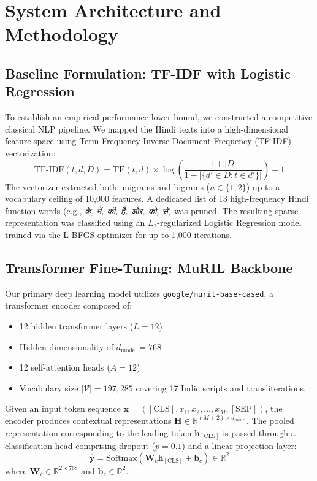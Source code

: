 \documentclass[11pt,a4paper]{article}
\begin{document}
\section{System Architecture and Methodology}
\label{sec:methodology}

\subsection{Baseline Formulation: TF-IDF with Logistic Regression}
To establish an empirical performance lower bound, we constructed a competitive classical NLP pipeline. We mapped the Hindi texts into a high-dimensional feature space using Term Frequency-Inverse Document Frequency (TF-IDF) vectorization:
\begin{equation}
\text{TF-IDF}(t, d, D) = \text{TF}(t, d) \times \log\left(\frac{1 + |D|}{1 + |\{d' \in D : t \in d'\}|}\right) + 1
\end{equation}
The vectorizer extracted both unigrams and bigrams ($n \in \{1, 2\}$) up to a vocabulary ceiling of 10,000 features. A dedicated list of 13 high-frequency Hindi function words (e.g., \textit{के, में, की, है, और, को, से}) was pruned. The resulting sparse representation was classified using an $L_2$-regularized Logistic Regression model trained via the L-BFGS optimizer for up to 1,000 iterations.

\subsection{Transformer Fine-Tuning: MuRIL Backbone}
Our primary deep learning model utilizes \texttt{google/muril-base-cased}, a transformer encoder composed of:
\begin{itemize}
    \item 12 hidden transformer layers ($L = 12$)
    \item Hidden dimensionality of $d_{\text{model}} = 768$
    \item 12 self-attention heads ($A = 12$)
    \item Vocabulary size $|\mathcal{V}| = 197,285$ covering 17 Indic scripts and transliterations.
\end{itemize}

Given an input token sequence $\mathbf{x} = ([\text{CLS}], x_1, x_2, \dots, x_M, [\text{SEP}])$, the encoder produces contextual representations $\mathbf{H} \in \mathbb{R}^{(M+2) \times d_{\text{model}}}$. The pooled representation corresponding to the leading token $\mathbf{h}_{[\text{CLS}]}$ is passed through a classification head comprising dropout ($p = 0.1$) and a linear projection layer:
\begin{equation}
\hat{\mathbf{y}} = \text{Softmax}(\mathbf{W}_c \mathbf{h}_{[\text{CLS}]} + \mathbf{b}_c) \in \mathbb{R}^2
\end{equation}
where $\mathbf{W}_c \in \mathbb{R}^{2 \times 768}$ and $\mathbf{b}_c \in \mathbb{R}^2$.
\end{document}
